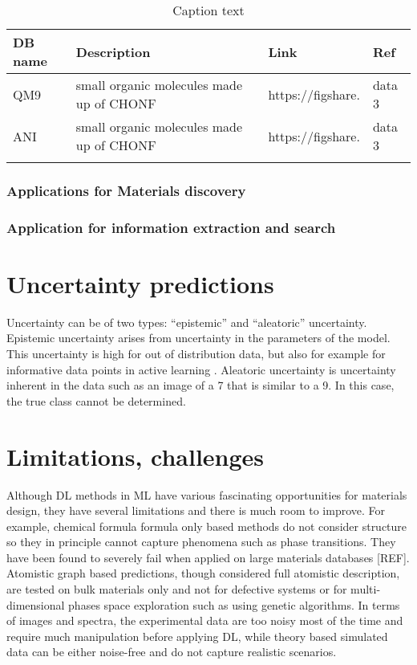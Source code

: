 \documentclass[pdflatex,sn-mathphys]{sn-jnl}%
\theoremstyle{thmstyleone}%
\theoremstyle{thmstyletwo}%
\theoremstyle{thmstylethree}%
\begin{document}
\begin{table}[h]

\begin{minipage}{174pt}
\caption{Caption text}\label{tab:nlp-sw}%
\begin{tabular}{@{}llll@{}}
\toprule
DB name & Description & Link  & Ref\\
\midrule
QM9   &  small organic molecules made up of CHONF  & https://figshare.   & data 3  \\

ANI   &  small organic molecules made up of CHONF  & https://figshare.   & data 3  \\


\botrule
\end{tabular}
\end{minipage}
\end{table}



\subsubsection{Applications for Materials discovery}

\subsubsection{Application for information extraction and search}


\section{Uncertainty predictions}\label{sec:uncertainty}
Uncertainty can be of two types: “epistemic” and “aleatoric” uncertainty. Epistemic uncertainty arises from uncertainty in the parameters of the model. This uncertainty is high for out of distribution data, but also for example for informative data points in active learning . Aleatoric uncertainty is uncertainty inherent in the data such as an image of a 7 that is similar to a 9. In this case, the true class cannot be determined.


\section{Limitations, challenges}\label{sec:challenges}

Although DL methods in ML have various fascinating opportunities for materials design, they have several limitations and there is much room to improve. For example, chemical formula formula only based methods do not consider structure so they in principle cannot capture phenomena such as phase transitions. They have been found to severely fail when applied on large materials databases [REF]. Atomistic graph based predictions, though considered full atomistic description, are tested on bulk materials only and not for defective systems or for multi-dimensional phases space exploration such as using genetic algorithms. In terms of images and spectra, the experimental data are too noisy most of the time and require much manipulation before applying DL, while theory based simulated data can be either noise-free and do not capture realistic scenarios.
\end{document}
